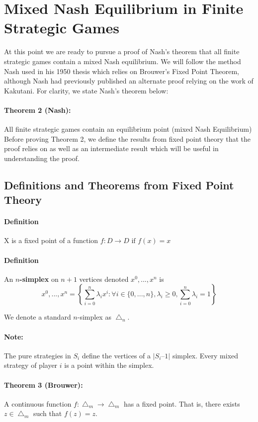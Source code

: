 \documentclass[12pt]{article}
\newcommand{\Note}{\paragraph{Note:}}
\newcommand{\Definition}{\paragraph{Definition}}
\begin{document}
\section{Mixed Nash Equilibrium in Finite Strategic Games}

At this point we are ready to pursue a proof of Nash's theorem that all finite strategic games contain a mixed Nash equilibrium. We will follow the method Nash used in his 1950 thesis which relies on Brouwer's Fixed Point Theorem, although Nash had previously published an alternate proof relying on the work of Kakutani. For clarity, we state Nash's theorem below:

\paragraph{Theorem 2 (Nash):} All finite strategic games contain an equilibrium point (mixed Nash Equilibrium)\\

Before proving Theorem 2, we define the results from fixed point theory that the proof relies on as well as an intermediate result which will be useful in understanding the proof.

\subsection{Definitions and Theorems from Fixed Point Theory}

\Definition X is a fixed point of a function $f: D \rightarrow D \text{ if } f(x) = x$

\Definition An \textbf{$n$-simplex}\cite{4} on $n+1$ vertices denoted $x^0,...,x^n$ is 
\begin{equation*}
x^0,...,x^n = \left \{ \sum\limits_{i=0}^n \lambda_i x^i : \forall i \in \{0,...,n\}, \lambda_i \geq 0, \sum\limits_{i = 0}^n \lambda_i = 1 \right \}
\end{equation*}

We denote a standard $n$-simplex as $\bigtriangleup_n$.

\Note The pure strategies in $S_i$ define the vertices of a $|S_i – 1|$ simplex. Every mixed strategy of player $i$ is a point within the simplex. 

\paragraph{Theorem 3 (Brouwer):} A continuous function $f: \bigtriangleup_m \rightarrow \bigtriangleup_m$ has a fixed point. That is, there exists $z \in \bigtriangleup_m$ such that $f(z) = z$.
\end{document}
